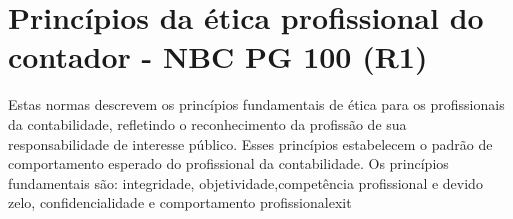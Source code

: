 \section{Princípios da ética profissional do contador - NBC PG 100 (R1)}
Estas normas descrevem os princípios fundamentais de ética para os profissionais da contabilidade, refletindo o reconhecimento da profissão de sua responsabilidade de interesse público. Esses princípios estabelecem o padrão de comportamento esperado do profissional da contabilidade. Os princípios fundamentais são: integridade, objetividade,competência profissional e devido zelo, confidencialidade e comportamento profissionalexit
% 
%                                                      
 

